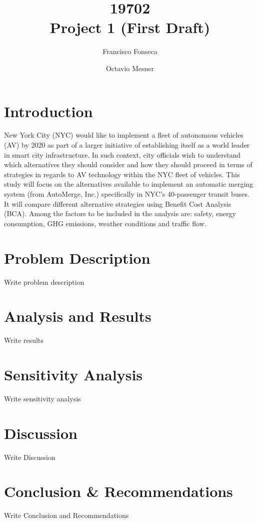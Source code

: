 \documentclass[11pt, letterpaper]{article}
\title{\vspace{-2cm} 19702 \\ Project 1 (First Draft)}
\author{Francisco Fonseca \and Octavio Mesner}
\date{\mydate}
\date{\mydateformat\normalsize\mydate} %
\begin{document}
\maketitle %

\section{Introduction}

New York City (NYC) would like to implement a fleet of autonomous vehicles (AV) by 2020 as part of a larger initiative of establishing itself as a world leader in smart city infrastructure. In such context, city officials wish to understand which alternatives they should consider and how they should proceed in terms of strategies in regards to AV technology within the NYC fleet of vehicles. This study will focus on the alternatives available to implement an automatic merging system (from AutoMerge, Inc.) specifically in NYC's 40-passenger transit buses. It will compare different alternative strategies using Benefit Cost Analysis (BCA). Among the factors to be included in the analysis are: safety, energy consumption, GHG emissions, weather conditions and traffic flow.

\section{Problem Description}

Write problem description

\section{Analysis and Results}

Write results

\section{Sensitivity Analysis}

Write sensitivity analysis

\section{Discussion}

Write Discussion

\section{Conclusion \& Recommendations}

Write Conclusion and Recommendations
\end{document}
